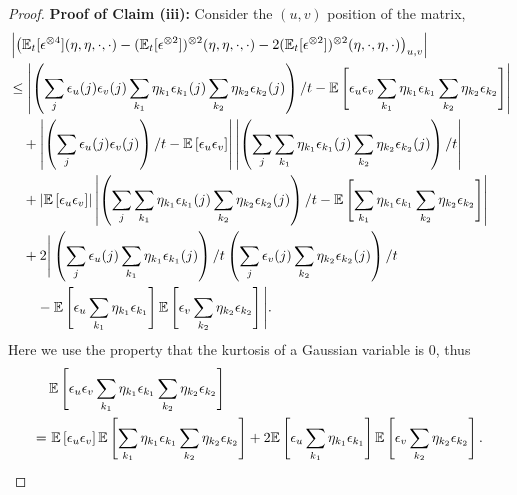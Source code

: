 \begin{proof}
	\vspace{5mm}
	{\bf Proof of Claim (iii):} 
	Consider the $(u,v)$ position of the matrix,
	\begin{align*}
	&\left|\left(\mathbb{E}_t[\epsilon^{\otimes4}](\eta,\eta,\cdot,\cdot) - (\mathbb{E}_t[\epsilon^{\otimes2}])^{\otimes 2}(\eta,\eta,\cdot,\cdot) - 2(\mathbb{E}_t[\epsilon^{\otimes2}])^{\otimes 2}(\eta,\cdot,\eta,\cdot) \right)_{u,v}\right|\\
	& \le \left| \left(\sum_j \epsilon_u(j)\epsilon_v(j)\sum_{k_1}\eta_{k_1}\epsilon_{k_1}(j)\sum_{k_2}\eta_{k_2}\epsilon_{k_2}(j)\right)/t- \mathbb{E}\left[ \epsilon_{u}\epsilon_{v}\sum_{k_1}\eta_{k_1}\epsilon_{k_1}\sum_{k_2}\eta_{k_2}\epsilon_{k_2}\right]\right| \\ 
	& \quad + \left| \left(\sum_j \epsilon_u(j)\epsilon_v(j)\right)/t -  \mathbb{E}\left[ \epsilon_{u}\epsilon_{v}\right]\right|\left|\left(\sum_j\sum_{k_1}\eta_{k_1}\epsilon_{k_1}(j)\sum_{k_2}\eta_{k_2}\epsilon_{k_2}(j)\right)/t \right| \\
	& \quad + \left| \mathbb{E}\left[ \epsilon_{u}\epsilon_{v}\right] \right| \left| \left(\sum_j\sum_{k_1}\eta_{k_1}\epsilon_{k_1}(j)\sum_{k_2}\eta_{k_2}\epsilon_{k_2}(j)\right)/t - \mathbb{E}\left[\sum_{k_1}\eta_{k_1}\epsilon_{k_1}\sum_{k_2}\eta_{k_2}\epsilon_{k_2}\right]\right| \\
	& \quad + 2\Bigg| \left(\sum_j \epsilon_u(j)\sum_{k_1}\eta_{k_1}\epsilon_{k_1}(j)\right)/t\left(\sum_j \epsilon_v(j)\sum_{k_2}\eta_{k_2}\epsilon_{k_2}(j)\right)/t \\
	& \qquad - \mathbb{E}\left[ \epsilon_{u}\sum_{k_1}\eta_{k_1}\epsilon_{k_1}\right]\mathbb{E}\left[\epsilon_{v}\sum_{k_2}\eta_{k_2}\epsilon_{k_2}\right]\Bigg|. 
	\end{align*}
	Here we use the property that the kurtosis of a Gaussian variable is 0, thus 
	\begin{align*}
	&\mathbb{E}\left[ \epsilon_{u}\epsilon_{v}\sum_{k_1}\eta_{k_1}\epsilon_{k_1}\sum_{k_2}\eta_{k_2}\epsilon_{k_2}\right] \\
	=\,&\,
	\mathbb{E}\left[ \epsilon_{u}\epsilon_{v}\right]\mathbb{E}\left[\sum_{k_1}\eta_{k_1}\epsilon_{k_1}\sum_{k_2}\eta_{k_2}\epsilon_{k_2}\right]
	+ 2\mathbb{E}\left[ \epsilon_{u}\sum_{k_1}\eta_{k_1}\epsilon_{k_1}\right]\mathbb{E}\left[\epsilon_{v}\sum_{k_2}\eta_{k_2}\epsilon_{k_2}\right].
	\end{align*}
	

\end{proof}
